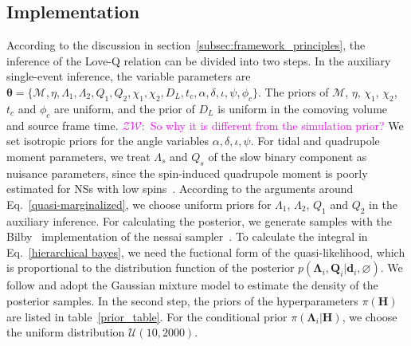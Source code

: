 \documentclass[a4paper,11pt]{article}
\newcommand{\ZW}[1]{\textcolor{magenta}{$\mathcal{ZW}$:~#1}}
\begin{document}
\subsection{Implementation}
\label{subsec:simulation_implementation}

According to the discussion in section~\ref{subsec:framework_principles}, the inference of the Love-Q relation
can be divided into two steps.
In the auxiliary single-event inference, the variable parameters are $\bm{\theta} = \{\mathcal{M},\eta,
\Lambda_1,\Lambda_2,Q_1,Q_2,\chi_1,\chi_2,D_L,t_c,\alpha,\delta,\iota,\psi,\phi_c\}
$. The priors of $\mathcal{M}$, $\eta$, $\chi_1$, $\chi_2$, $t_c$ and $\phi_c$ are uniform, and
the prior of $D_L$ is uniform in the comoving volume and source frame time.
\ZW{So why it is different from the simulation prior?
} We 
set isotropic priors for the angle variables $\alpha,\delta,\iota,\psi$. For tidal 
and quadrupole moment parameters, we treat $\Lambda_s$ and $Q_s$ of the slow 
binary component as nuisance parameters, since the spin-induced 
quadrupole moment is poorly estimated for NSs with low spins~\cite{Yagi:2013awa}.
According to the arguments around Eq.~\eqref{quasi-marginalized}, we choose
uniform priors for $\Lambda_1$, $\Lambda_2$, $Q_1$ and $Q_2$ in the auxiliary inference.
For calculating the posterior, we generate samples with the {\sc
Bilby}~\cite{Ashton:2018jfp} implementation of the {\sc nessai}
sampler~\cite{Skilling:2004pqw,Skilling:2006gxv,michael_j_williams_2025_14627250,PhysRevD.103.103006,Williams:2023ppp}.
To calculate the integral in Eq.~\eqref{hierarchical bayes}, we need the
fuctional form of the quasi-likelihood, which is proportional to the
distribution function of the posterior
$p(\bm{\Lambda}_i,\bm{Q}_i|\bm{d}_i,\varnothing)$. We follow
\citet{Golomb:2021tll} and adopt the Gaussian mixture 
model to estimate the density of the posterior samples.
In the second step, the priors of the hyperparameters $\pi(\bm{H})$ are listed
in table~\ref{prior_table}. For the conditional prior $\pi(\bm
{\Lambda}_i|\bm{H})$, we choose the uniform distribution $\mathcal{U}(10,2000)$. 
\end{document}
